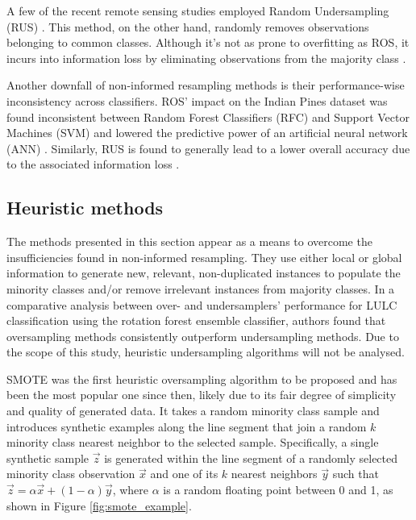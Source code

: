 \documentclass[parskip=full]{scrartcl}
\begin{document}
A few of the recent remote sensing studies employed Random Undersampling (RUS)
\cite{Ferreira2019}. This method, on the other hand, randomly removes
observations belonging to common classes. Although it's not as prone to
overfitting as ROS, it incurs into information loss by eliminating observations
from the majority class \cite{Feng2019}.

Another downfall of non-informed resampling methods is their performance-wise
inconsistency across classifiers. ROS' impact on the Indian Pines dataset was
found inconsistent between Random Forest Classifiers (RFC) and Support Vector
Machines (SVM) and lowered the predictive power of an artificial neural network
(ANN) \cite{Maxwell2018}. Similarly, RUS is found to generally lead to a lower
overall accuracy due to the associated information loss \cite{Maxwell2018}.

\subsection{Heuristic methods}

The methods presented in this section appear as a means to overcome the
insufficiencies found in non-informed resampling. They use either local or
global information to generate new, relevant, non-duplicated instances to
populate the minority classes and/or remove irrelevant instances from majority
classes. In a comparative analysis between over- and undersamplers' performance
for LULC classification \cite{Feng2018} using the rotation forest ensemble
classifier, authors found that oversampling methods consistently outperform
undersampling methods. Due to the scope of this study, heuristic undersampling
algorithms will not be analysed.

SMOTE \cite{Chawla2002} was the first heuristic oversampling algorithm to be
proposed and has been the most popular one since then, likely due to its fair
degree of simplicity and quality of generated data. It takes a random minority
class sample and introduces synthetic examples along the line segment that join
a random $k$ minority class nearest neighbor to the selected sample.
Specifically, a single synthetic sample $\overrightarrow{z}$ is generated within
the line segment of a randomly selected minority class observation
$\overrightarrow{x}$ and one of its $k$ nearest neighbors $\overrightarrow{y}$
such that $\overrightarrow{z} =
\alpha\overrightarrow{x}+(1-\alpha)\overrightarrow{y}$, where $\alpha$ is a
random floating point between 0 and 1, as shown in Figure
\ref{fig:smote_example}.
\end{document}
